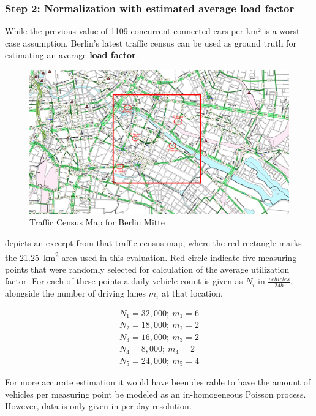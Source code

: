 \subsubsection{Step 2: Normalization with estimated average load factor}
While the previous value of 1109 concurrent connected cars per km² is a worst-case assumption, Berlin's latest traffic census \cite{VerkehrslenkungBerlinVLB2014} can be used as ground truth for estimating an average \textbf{load factor}. 

\begin{figure}[H]
	\centering
	\includegraphics[width=1.0\linewidth]{98_images/berlin_traffic_map_2}
	\caption[Traffic Census Map for Berlin Mitte]{Traffic Census Map for Berlin Mitte \cite{VerkehrslenkungBerlinVLB2014}}
	\label{fig:berlin_traffic_map}
\end{figure}

 depicts an excerpt from that traffic census map, where the red rectangle marks the \SI{21.25}{\square\km} area used in this evaluation. Red circle indicate five measuring points that were randomly selected for calculation of the average utilization factor. For each of these points a daily vehicle count is given as $N_{i}$ in $\frac{vehicles}{24 h}$, alongside the number of driving lanes $m_i$ at that location.

\begin{gather*}
N_1 = 32,000; \  m_1 = 6 \\
N_2 = 18,000; \  m_2 = 2 \\
N_3 = 16,000; \  m_3 = 2 \\
N_4 = 8,000; \  m_4 = 2 \\
N_5 = 24,000; \  m_5 = 4
\end{gather*}

For more accurate estimation it would have been desirable to have the amount of vehicles per measuring point be modeled as an in-homogeneous Poisson process. However, data is only given in per-day resolution. 

